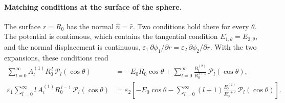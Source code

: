\paragraph{Matching conditions at the surface of the sphere.}
The surface $r = R_0$ has the normal $\hat n = \hat r$. Two conditions hold there for every $\theta$. The potential is continuous, which contains the tangential condition $E_{1,\theta} = E_{2,\theta}$, and the normal displacement is continuous, $\varepsilon_1\,\partial\phi_1/\partial r = \varepsilon_2\,\partial\phi_2/\partial r$. With the two expansions, these conditions read
\begin{equation}
    \boxed{
    \begin{aligned}
    \sum_{l=0}^{\infty} A_l^{(1)} R_0^{\,l}\,\mathcal{P}_l(\cos\theta)
    &= -E_0 R_0\cos\theta + \sum_{l=0}^{\infty}\frac{B_l^{(2)}}{R_0^{\,l+1}}\,\mathcal{P}_l(\cos\theta),\\
    \varepsilon_1\sum_{l=0}^{\infty} l\,A_l^{(1)} R_0^{\,l-1}\,\mathcal{P}_l(\cos\theta)
    &= \varepsilon_2\left[-E_0\cos\theta - \sum_{l=0}^{\infty}(l+1)\frac{B_l^{(2)}}{R_0^{\,l+2}}\,\mathcal{P}_l(\cos\theta)\right].
    \end{aligned}
    }
\end{equation}

